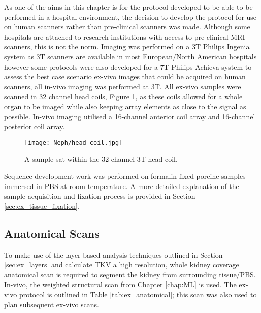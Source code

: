 As one of the aims in this chapter is for the protocol developed to be able to be performed in a hospital environment, the decision to develop the protocol for use on human scanners rather than pre-clinical scanners was made. Although some hospitals are attached to research institutions with access to pre-clinical \ac{MRI} scanners, this is not the norm. Imaging was performed on a 3T Philips Ingenia system as 3T scanners are available in most European/North American hospitals however some protocols were also developed for a 7T Philips Achieva system to assess the best case scenario ex-vivo images that could be acquired on human scanners, all in-vivo imaging was performed at 3T. All ex-vivo samples were scanned in 32 channel head coils, Figure \ref{fig:ex_head_coil}, as these coils allowed for a whole organ to be imaged while also keeping array elements as close to the signal as possible. In-vivo imaging utilised a 16-channel anterior coil array and 16-channel posterior coil array.

\begin{figure}[H]
	\centering
	\texttt{[image: Neph/head\_coil.jpg]}
	\caption{A sample sat within the 32 channel 3T head coil.}
	\label{fig:ex_head_coil}	
\end{figure}

Sequence development work was performed on formalin fixed porcine samples immersed in \ac{PBS} at room temperature. A more detailed explanation of the sample acquisition and fixation process is provided in Section \ref{sec:ex_tissue_fixation}.

\subsection{Anatomical Scans}

To make use of the layer based analysis techniques outlined in Section \ref{sec:ex_layers} and calculate \ac{TKV} a high resolution, whole kidney coverage anatomical scan is required to segment the kidney from surrounding tissue/\ac{PBS}. In-vivo, the \ttwo weighted structural scan from Chapter \ref{chap:ML} is used. The ex-vivo protocol is outlined in Table \ref{tab:ex_anatomical}; this scan was also used to plan subsequent ex-vivo scans.

